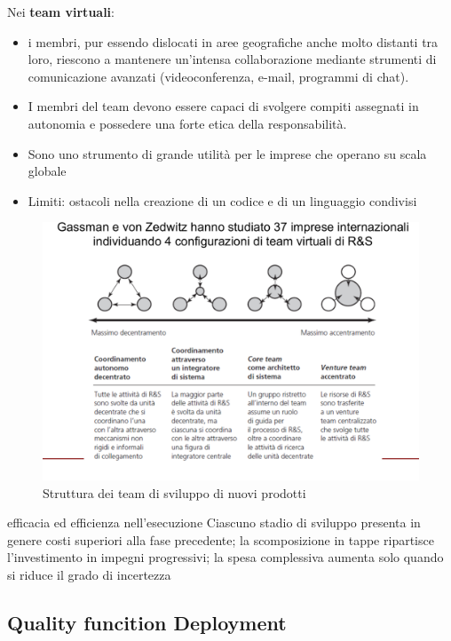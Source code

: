 \documentclass{article}
\begin{document}
Nei \textbf{team virtuali}:
\begin{itemize}
\item  i membri, pur essendo dislocati in aree geografiche anche molto
distanti tra loro, riescono a mantenere un’intensa collaborazione
mediante strumenti di comunicazione avanzati (videoconferenza,
e-mail, programmi di chat).
\item  I membri del team devono essere capaci di svolgere compiti
assegnati in autonomia e possedere una forte etica della
responsabilità.
\item  Sono uno strumento di grande utilità per le imprese che operano
su scala globale
\item  Limiti: ostacoli nella creazione di un codice e di un linguaggio
condivisi
\end{itemize}

\begin{figure}[h!]
	\centering
	\includegraphics[scale=0.4]{images/virtuali.png}
	\caption{Struttura dei team di sviluppo di nuovi prodotti}
	\label{fig:virtuali}
\end{figure}

efficacia ed efficienza
nell’esecuzione
Ciascuno stadio di
sviluppo presenta in
genere costi superiori
alla fase precedente; la
scomposizione in tappe
ripartisce l’investimento
in impegni progressivi;
la spesa complessiva
aumenta solo quando si
riduce il grado di
incertezza

\subsection{Quality funcition Deployment}
\end{document}
